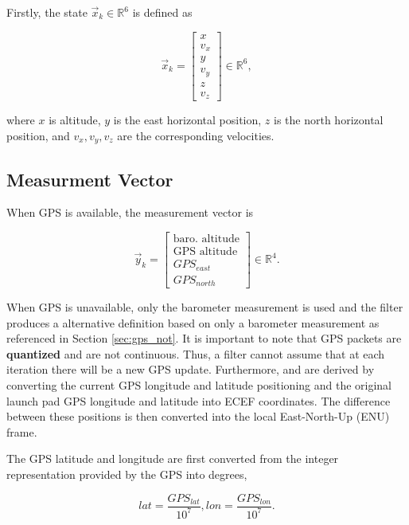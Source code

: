 \documentclass{article}
\begin{document}
Firstly, the state $\vec{x}_k \in \mathbb{R}^6$ is defined as

\begin{equation}
   \vec{x}_k =
\begin{bmatrix}
x \\ v_x \\ y \\ v_y \\ z \\ v_z 
\end{bmatrix} \in \mathbb{R}^6,
\end{equation}

where $x$ is altitude, $y$ is the east horizontal position,
$z$ is the north horizontal position, and $v_x, v_y, v_z$ are the corresponding velocities. 

\subsection{Measurment Vector}
When GPS is available, the measurement vector is

\begin{equation}
    \vec{y}_k =
\begin{bmatrix}
\text{baro. altitude} \\
\text{GPS altitude} \\
\text{$GPS_{east}$} \\
\text{$GPS_{north}$}
\end{bmatrix} \in \mathbb{R}^4 .
\end{equation}


When GPS is unavailable, only the barometer measurement is used and the filter produces a alternative definition based on only a barometer measurement as referenced in Section \ref{sec:gps_not}. It is important to note that GPS packets are \textbf{quantized} and are not continuous. Thus, a filter cannot assume that at each iteration there will be a new GPS update.  Furthermore,  and  are derived by converting the current GPS longitude and latitude positioning and the original launch pad GPS longitude and latitude into ECEF coordinates. The difference between these positions is then converted into the local East-North-Up (ENU) frame. 

The GPS latitude and longitude are first converted from the integer representation provided by the GPS into degrees,

\begin{equation}
{lat} = \frac{{GPS}_{lat}}{10^7},
{lon} = \frac{{GPS}_{lon}}{10^7}.
\end{equation}
\end{document}
